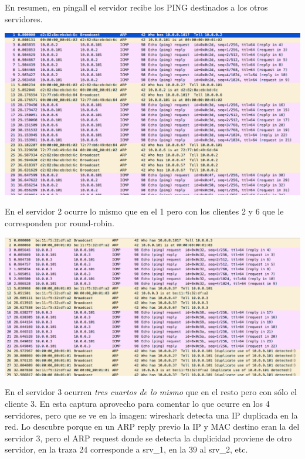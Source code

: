 \documentclass{article}
\begin{document}
En resumen, en pingall el servidor recibe los PING destinados a los otros servidores.

\hfill

\begin{center}
	\includegraphics[scale=0.5]{images/srv2.png}
\end{center}


En el servidor 2 ocurre lo mismo que en el 1 pero con los clientes 2 y 6 que le corresponden por round-robin.

\hfill

\begin{center}
	\includegraphics[scale=0.5]{images/srv3.png}
\end{center}

En el servidor 3 ocurren \textit{tres cuartos de lo mismo} que en el resto pero con sólo el cliente 3. En esta captura aprovecho para comentar lo que ocurre en los 4 servidores, pero que se ve en la imagen: wireshark detecta una IP duplicada en la red. Lo descubre porque en un ARP reply previo la IP y MAC destino eran la del servidor 3, pero el ARP request donde se detecta la duplicidad proviene de otro servidor, en la traza 24 corresponde a srv\_1, en la 39 al srv\_2, etc.
\end{document}
